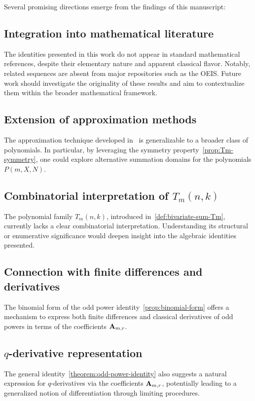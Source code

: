 Several promising directions emerge from the findings of this manuscript:

\subsection{Integration into mathematical literature}
\label{subsec:integration-into-mathematical-literature}
The identities presented in this work do not appear in standard mathematical references,
despite their elementary nature and apparent classical flavor.
Notably, related sequences are absent from major repositories such as the OEIS\@.
Future work should investigate the originality of these results and aim to contextualize
them within the broader mathematical framework.

\subsection{Extension of approximation methods}
\label{subsec:extension-of-approximation-methods}
The approximation technique developed in~\cite{kolosov2025efficient} is generalizable
to a broader class of polynomials.
In particular, by leveraging the symmetry property~\eqref{prop:Tm-symmetry},
one could explore alternative summation domains for the polynomials $P(m, X, N)$.

\subsection{Combinatorial interpretation of $T_m(n,k)$}
\label{subsec:combinatorial-interpretation-of-T}
The polynomial family $T_m(n,k)$, introduced in~\eqref{def:bivariate-sum-Tm},
currently lacks a clear combinatorial interpretation.
Understanding its structural or enumerative significance would deepen insight into
the algebraic identities presented.

\subsection{Connection with finite differences and derivatives}
\label{subsec:connection-with-finite-differences-and-derivatives}
The binomial form of the odd power identity~\eqref{prop:binomial-form} offers a mechanism
to express both finite differences and classical derivatives of odd powers in terms
of the coefficients ${\mathbf{A}} \sb{m,r}$.

\subsection{$q$-derivative representation}
\label{subsec:q-derivative-representation}
The general identity~\eqref{theorem:odd-power-identity} also suggests a natural
expression for $q$-derivatives via the coefficients ${\mathbf{A}} \sb{m,r}$,
potentially leading to a generalized notion of differentiation through limiting procedures.

